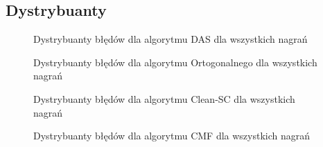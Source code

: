 \documentclass[12pt]{article}
\begin{document}
\subsection{Dystrybuanty}
\begin{figure}[h]
    \centering
    \begin{minipage}[t]{0.48\textwidth}
        \centering
        
        \vspace{-20pt}
        \caption{Dystrybuanty błędów dla algorytmu DAS dla wszystkich nagrań}
    \end{minipage}\hfill
    \begin{minipage}[t]{0.48\textwidth}
        \centering
        
        \vspace{-20pt}
        \caption{Dystrybuanty błędów dla algorytmu Ortogonalnego dla wszystkich nagrań}
    \end{minipage}
\end{figure}
\begin{figure}[h]
    \centering
    \begin{minipage}[t]{0.48\textwidth}
        \centering
        
        \caption{Dystrybuanty błędów dla algorytmu Clean-SC dla wszystkich nagrań}
    \end{minipage}\hfill
    \begin{minipage}[t]{0.48\textwidth}
        \centering
        
        \caption{Dystrybuanty błędów dla algorytmu CMF dla wszystkich nagrań}
    \end{minipage}
\end{figure}

\newpage
\printbibliography[heading=bibintoc]
\end{document}

